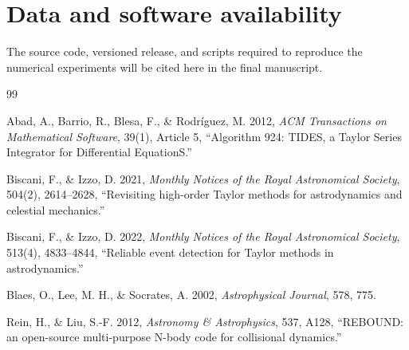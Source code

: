 \documentclass[11pt]{article}
\begin{document}


\section*{Data and software availability}


The source code, versioned release, and scripts required to reproduce the
numerical experiments will be cited here in the final manuscript.


\begin{thebibliography}{99}

Abad, A., Barrio, R., Blesa, F., \& Rodr\'iguez, M. 2012,
\emph{ACM Transactions on Mathematical Software}, 39(1), Article 5,
``Algorithm 924: TIDES, a Taylor Series Integrator for Differential
EquationS.''

Biscani, F., \& Izzo, D. 2021,
\emph{Monthly Notices of the Royal Astronomical Society},
504(2), 2614--2628,
``Revisiting high-order Taylor methods for astrodynamics and celestial
mechanics.''

Biscani, F., \& Izzo, D. 2022,
\emph{Monthly Notices of the Royal Astronomical Society},
513(4), 4833--4844,
``Reliable event detection for Taylor methods in astrodynamics.''

Blaes, O., Lee, M. H., \& Socrates, A. 2002,
\emph{Astrophysical Journal}, 578, 775.

Rein, H., \& Liu, S.-F. 2012,
\emph{Astronomy \& Astrophysics}, 537, A128,
``REBOUND: an open-source multi-purpose N-body code for collisional
dynamics.''

\end{thebibliography}
\end{document}

